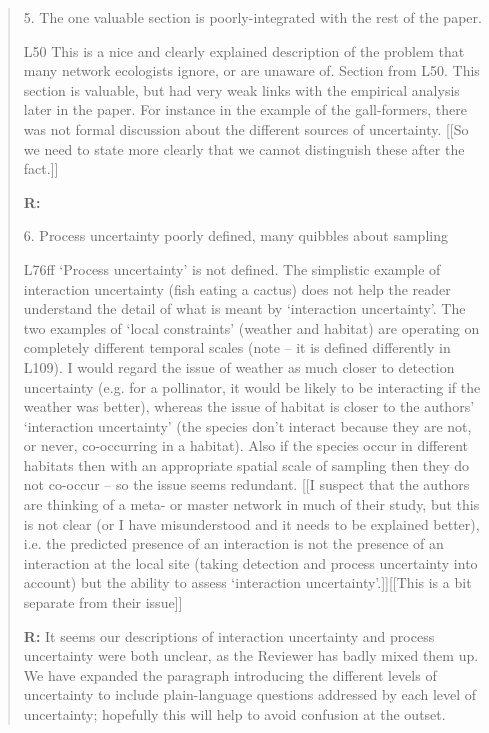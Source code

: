 \documentclass[12pt]{letter}
\newenvironment{refquote}{\bigskip \begin{it}}{\end{it}\smallskip}
\begin{document}
\begin{quotation}
	5. The one valuable section is poorly-integrated with the rest of the paper.

	\begin{refquote}
	L50 This is a nice and clearly explained description of the problem that many network ecologists ignore, or are unaware of.
	Section from L50. This section is valuable, but had very weak links with the empirical analysis later in the paper. For instance in the example of the gall-formers, there was not formal discussion about the different sources of uncertainty. [[So we need to state more clearly that we cannot distinguish these after the fact.]]
	\end{refquote}

	\textbf{R:}

	6. Process uncertainty poorly defined, many quibbles about sampling

	\begin{refquote}
	L76ff ‘Process uncertainty’ is not defined. The simplistic example of interaction uncertainty (fish eating a cactus) does not help the reader understand the detail of what is meant by ‘interaction uncertainty’. The two examples of ‘local constraints’ (weather and habitat) are operating on completely different temporal scales (note – it is defined differently in L109). I would regard the issue of weather as much closer to detection uncertainty (e.g. for a pollinator, it would be likely to be interacting if the weather was better), whereas the issue of habitat is closer to the authors’ ‘interaction uncertainty’ (the species don’t interact because they are not, or never, co-occurring in a habitat). Also if the species occur in different habitats then with an appropriate spatial scale of sampling then they do not co-occur – so the issue seems redundant. [[I suspect that the authors are thinking of a meta- or master network in much of their study, but this is not clear (or I have misunderstood and it needs to be explained better), i.e. the predicted presence of an interaction is not the presence of an interaction at the local site (taking detection and process uncertainty into account) but the ability to assess ‘interaction uncertainty’.]][[This is a bit separate from their issue]]
	\end{refquote}

	\textbf{R:} It seems our descriptions of interaction uncertainty and process uncertainty were both unclear, as the Reviewer has badly mixed them up. We have expanded the paragraph introducing the different levels of uncertainty to include plain-language questions addressed by each level of uncertainty; hopefully this will help to avoid confusion at the outset.
		

\end{quotation}
\end{document}
